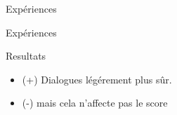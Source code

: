 \documentclass[french]{beamer}
\begin{document}
    \begin{frame}{Expériences}

        \begin{figure}
            \captionsetup[subfigure]{labelformat=empty}
            \begin{center}
            \end{center}
        \end{figure}


    \end{frame}
    \begin{frame}{Expériences}

        \begin{block}{Resultats}
            \begin{itemize}
                \item (+) Dialogues légérement plus sûr. %
                \item (-) mais cela n'affecte pas le score
            \end{itemize}
        \end{block}

    \end{frame}
\end{document}
